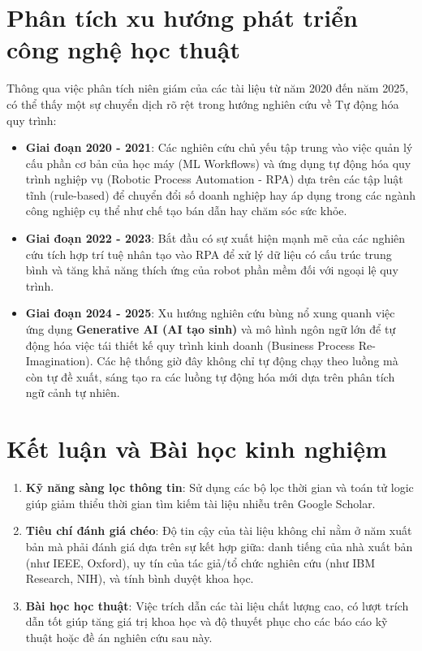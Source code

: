 \documentclass[12pt,a4paper]{article}
\begin{document}
\newpage
\section{Phân tích xu hướng phát triển công nghệ học thuật}
Thông qua việc phân tích niên giám của các tài liệu từ năm 2020 đến năm 2025, có thể thấy một sự chuyển dịch rõ rệt trong hướng nghiên cứu về Tự động hóa quy trình:
\begin{itemize}
    \item \textbf{Giai đoạn 2020 - 2021}: Các nghiên cứu chủ yếu tập trung vào việc quản lý cấu phần cơ bản của học máy (ML Workflows) và ứng dụng tự động hóa quy trình nghiệp vụ (Robotic Process Automation - RPA) dựa trên các tập luật tĩnh (rule-based) để chuyển đổi số doanh nghiệp hay áp dụng trong các ngành công nghiệp cụ thể như chế tạo bán dẫn hay chăm sóc sức khỏe.
    \item \textbf{Giai đoạn 2022 - 2023}: Bắt đầu có sự xuất hiện mạnh mẽ của các nghiên cứu tích hợp trí tuệ nhân tạo vào RPA để xử lý dữ liệu có cấu trúc trung bình và tăng khả năng thích ứng của robot phần mềm đối với ngoại lệ quy trình.
    \item \textbf{Giai đoạn 2024 - 2025}: Xu hướng nghiên cứu bùng nổ xung quanh việc ứng dụng \textbf{Generative AI (AI tạo sinh)} và mô hình ngôn ngữ lớn để tự động hóa việc tái thiết kế quy trình kinh doanh (Business Process Re-Imagination). Các hệ thống giờ đây không chỉ tự động chạy theo luồng mà còn tự đề xuất, sáng tạo ra các luồng tự động hóa mới dựa trên phân tích ngữ cảnh tự nhiên.
\end{itemize}

\section{Kết luận và Bài học kinh nghiệm}
\begin{enumerate}
    \item \textbf{Kỹ năng sàng lọc thông tin}: Sử dụng các bộ lọc thời gian và toán tử logic giúp giảm thiểu thời gian tìm kiếm tài liệu nhiễu trên Google Scholar.
    \item \textbf{Tiêu chí đánh giá chéo}: Độ tin cậy của tài liệu không chỉ nằm ở năm xuất bản mà phải đánh giá dựa trên sự kết hợp giữa: danh tiếng của nhà xuất bản (như IEEE, Oxford), uy tín của tác giả/tổ chức nghiên cứu (như IBM Research, NIH), và tính bình duyệt khoa học.
    \item \textbf{Bài học học thuật}: Việc trích dẫn các tài liệu chất lượng cao, có lượt trích dẫn tốt giúp tăng giá trị khoa học và độ thuyết phục cho các báo cáo kỹ thuật hoặc đề án nghiên cứu sau này.
\end{enumerate}
\end{document}
